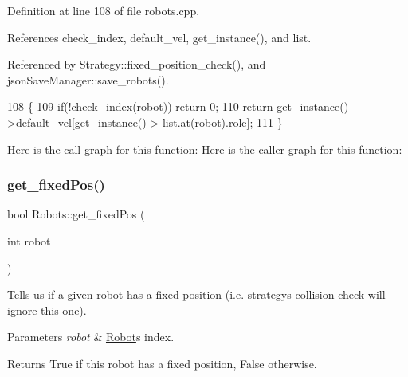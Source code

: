 Definition at line 108 of file robots.\+cpp.



References check\+\_\+index, default\+\_\+vel, get\+\_\+instance(), and list.



Referenced by Strategy\+::fixed\+\_\+position\+\_\+check(), and json\+Save\+Manager\+::save\+\_\+robots().


\begin{DoxyCode}
108                                             \{
109     \textcolor{keywordflow}{if}(!\hyperlink{robots_8hpp_ae3e6ae8f87cdc750c0b99bc609d9ae43}{check\_index}(robot)) \textcolor{keywordflow}{return} 0;
110     \textcolor{keywordflow}{return} \hyperlink{class_robots_a589bce74db5f34af384952d48435168f}{get\_instance}()->\hyperlink{class_robots_a6c03d49137645a67d5c5e39bb953a788}{default\_vel}[\hyperlink{class_robots_a589bce74db5f34af384952d48435168f}{get\_instance}()->
      \hyperlink{class_robots_a2c6b77265028f82a4342ca1ef15ed305}{list}.at(robot).role];
111 \}
\end{DoxyCode}
Here is the call graph for this function\+:
Here is the caller graph for this function\+:
\mbox{\label{class_robots_af1b330514c96d1cac03a895007b8b54e}} 
\subsubsection{\texorpdfstring{get\+\_\+fixed\+Pos()}{get\_fixedPos()}}
{\footnotesize\ttfamily bool Robots\+::get\+\_\+fixed\+Pos (\begin{DoxyParamCaption}\item[{int}]{robot }\end{DoxyParamCaption})\hspace{0.3cm}{\ttfamily [static]}}

Tells us if a given robot has a fixed position (i.\+e. strategy\textquotesingle{}s collision check will ignore this one). 
\begin{DoxyParams}{Parameters}
{\em robot} & \hyperlink{struct_robots_1_1_robot}{Robot}\textquotesingle{}s index. \\
\hline
\end{DoxyParams}
\begin{DoxyReturn}{Returns}
True if this robot has a fixed position, False otherwise. 
\end{DoxyReturn}


